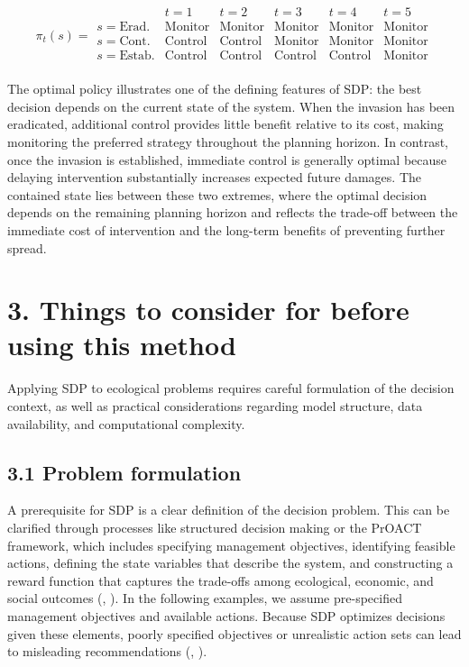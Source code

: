 \documentclass[
  11pt,
  a4paper,
]{article}
\begin{document}
\[
\pi_t(s) =
\begin{array}{c|ccccc}
 & t=1 & t=2 & t=3 & t=4 & t=5 \\
\hline
s =\text{Erad.} & \text{Monitor} & \text{Monitor} & \text{Monitor} & \text{Monitor} & \text{Monitor} \\
s = \text{Cont.} & \text{Control} & \text{Control} & \text{Monitor} & \text{Monitor} & \text{Monitor} \\
s = \text{Estab.} & \text{Control} & \text{Control} & \text{Control} & \text{Control} & \text{Monitor} \\
\end{array}
\]

The optimal policy illustrates one of the defining features of SDP: the best decision depends on the current state of the system. When the invasion has been eradicated, additional control provides little benefit relative to its cost, making monitoring the preferred strategy throughout the planning horizon. In contrast, once the invasion is established, immediate control is generally optimal because delaying intervention substantially increases expected future damages. The contained state lies between these two extremes, where the optimal decision depends on the remaining planning horizon and reflects the trade-off between the immediate cost of intervention and the long-term benefits of preventing further spread.

\section{3. Things to consider for before using this method}\label{things-to-consider-for-before-using-this-method}

Applying SDP to ecological problems requires careful formulation of the decision context, as well as practical considerations regarding model structure, data availability, and computational complexity.

\subsection{3.1 Problem formulation}\label{problem-formulation}

A prerequisite for SDP is a clear definition of the decision problem. This can be clarified through processes like structured decision making or the PrOACT framework, which includes specifying management objectives, identifying feasible actions, defining the state variables that describe the system, and constructing a reward function that captures the trade-offs among ecological, economic, and social outcomes (, ). In the following examples, we assume pre-specified management objectives and available actions. Because SDP optimizes decisions given these elements, poorly specified objectives or unrealistic action sets can lead to misleading recommendations (, ).
\end{document}
